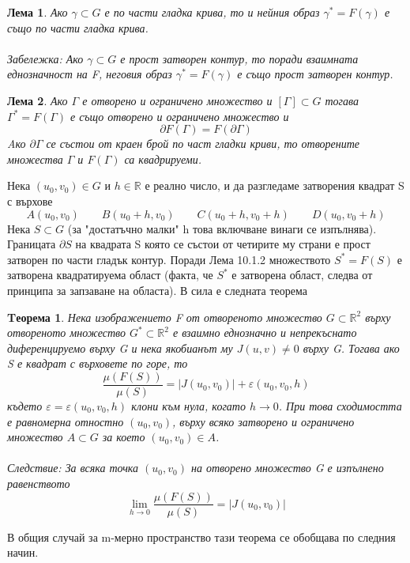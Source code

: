 \documentclass[a4paper,fleqn,12pt]{article}
\newtheorem{theorem}{Tеорема}[subsection]
\newtheorem{lemma}{Лема}[subsection]
\theoremstyle{definition}
\begin{document}
\begin{lemma}
Ако $\gamma \subset G$ е по части гладка крива, то и нейния образ $\gamma^* = F(\gamma)$ е също по части гладка крива.
\\
\\
Забележка: Ако $\gamma \subset G$ е прост затворен контур, то поради взаимната еднозначност на F, неговия образ $\gamma^* = F(\gamma)$ е също прост затворен контур. 
\end{lemma}


\begin{lemma}
Ако $\Gamma$ е отворено и ограничено множество и $[\Gamma] \subset G$ тогава $\Gamma^* = F(\Gamma)$ е също отворено и ограничено множество и 
$$\partial F(\Gamma) = F(\partial \Gamma)$$
Aко $\partial \Gamma$ се състои от краен брой по част гладки криви, то отворените множества $\Gamma$ и $F(\Gamma)$ са квадрируеми. 
\end{lemma}
Нека $(u_0, v_0) \in G$ и $h \in \mathbb{R}$ е реално число, и да разгледаме затворения квадрат S с върхове 
$$A(u_0, v_0) \qquad B(u_0+h, v_0) \qquad C(u_0 + h, v_0 + h) \qquad D(u_0, v_0 + h)$$
Нека $S \subset G$ (за "достатъчно малки" h това включване винаги се изпълнява). 
Границата $\partial S$ на квадрата S която се състои от четирите му страни е прост затворен по части гладък контур. 
Поради Лема 10.1.2 множеството $S^* = F(S)$ е затворена квадратируема област (факта, че $S^*$ е затворена област, следва от принципа за запзаване на областа). В сила е следната теорема

\begin{theorem}
Нека изображението F от отвореното множество $G \subset \mathbb{R}^2$ върху отвореното множество $G^* \subset \mathbb{R}^2$ е взаимно еднозначно и непрекъснато диференцируемо върху G и нека якобианът му $J(u,v) \neq 0 $ върху G.
Тогава ако S е квадрат с върховете по горе, то
$$\frac{\mu(F(S))}{\mu(S)} = \vert J(u_0,v_0)\vert + \varepsilon (u_0, v_0, h)$$
където $\varepsilon = \varepsilon (u_0, v_0, h)$ клони към нула, когато $h \to 0$. При това сходимостта е равномерна отностно $(u_0, v_0)$, върху всяко затворено и ограничено множество $A \subset G$ за което $(u_0, v_0) \in A$.\\
\\
Следствие: За всяка точка $(u_0, v_0)$ на отворено множество G е изпълнено равенството 
$$\lim\limits_{h \to 0} \frac{\mu(F(S))}{\mu(S)} = \vert J(u_0,v_0)\vert  $$
\end{theorem}
В общия случай за m-мерно пространство тази теорема се обобщава по следния начин.
\end{document}
